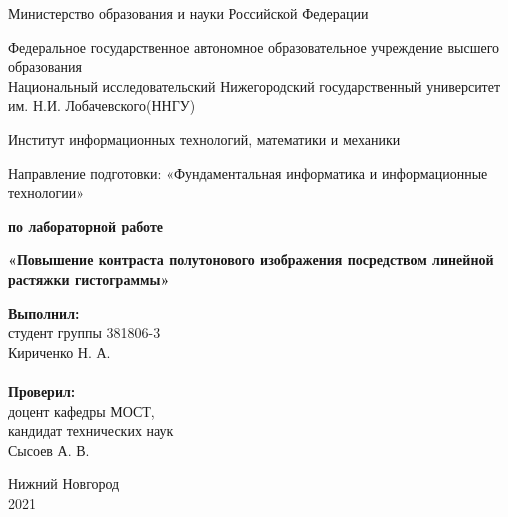 \documentclass{report}
\begin{document}
\begin{titlepage}
\begin{center}
Министерство образования и науки Российской Федерации
\end{center}
\begin{center}
Федеральное государственное автономное образовательное учреждение высшего образования \\
Национальный исследовательский Нижегородский государственный университет им. Н.И. Лобачевского(ННГУ)
\end{center}
\begin{center}
Институт информационных технологий, математики и механики
\end{center}
\begin{center}
Направление подготовки: «Фундаментальная информатика и информационные технологии»
\end{center}

\vspace{2em}

\begin{center}
\textbf{ по лабораторной работе} 
\end{center}
\begin{center}
\textbf{\Large«Повышение контраста полутонового изображения посредством линейной растяжки гистограммы»} \\
\end{center}

\vspace{4em}

\newbox{\lbox}
\newlength{\maxl}
\setlength{\maxl}{\wd\lbox}
\hfill\parbox{7cm}{
\textbf{Выполнил:} \\ студент группы 381806-3 \\ Кириченко Н. А.\\
\\
\textbf{Проверил:}\\ доцент кафедры МОСТ, \\ кандидат технических наук \\ Сысоев А. В.\\
}
\vspace{\fill}
\begin{center} Нижний Новгород \\ 2021 \end{center}
\end{titlepage}

\setcounter{page}{2}

\tableofcontents
\newpage
\end{document}
